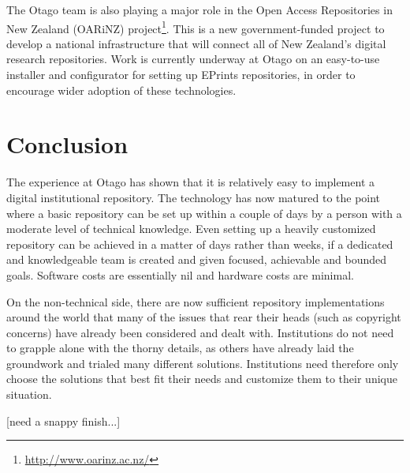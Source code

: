 \documentclass[12pt,pdftex,a4paper,titlepage]{article}
\begin{document}
The Otago team is also playing a major role in the Open Access Repositories in New Zealand (OARiNZ) project\footnote{\url{http://www.oarinz.ac.nz/}}. This is a new government-funded project to develop a national infrastructure that will connect all of New Zealand's digital research repositories. Work is currently underway at Otago on an easy-to-use installer and configurator for setting up EPrints repositories, in order to encourage wider adoption of these technologies.


\section{Conclusion}

The experience at Otago has shown that it is relatively easy to implement a digital institutional repository. The technology has now matured to the point where a basic repository can be set up within a couple of days by a person with a moderate level of technical knowledge. Even setting up a heavily customized repository can be achieved in a matter of days rather than weeks, if a dedicated and knowledgeable team is created and given focused, achievable and bounded goals. Software costs are essentially nil and hardware costs are minimal.

On the non-technical side, there are now sufficient repository implementations around the world that many of the issues that rear their heads (such as copyright concerns) have already been considered and dealt with. Institutions do not need to grapple alone with the thorny details, as others have already laid the groundwork and trialed many different solutions. Institutions need therefore only choose the solutions that best fit their needs and customize them to their unique situation.

[need a snappy finish...]



\end{document}
